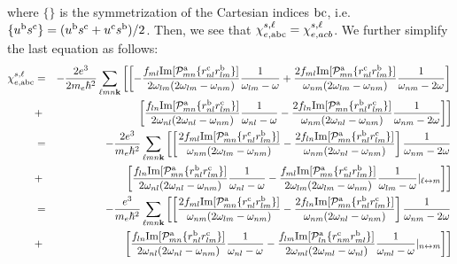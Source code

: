 \documentclass[floatfix,prb,aps,superscriptaddress,11pt,preprint]{revtex4}
\begin{document}
where $\{\}$ is the symmetrization of the Cartesian indices $\mathrm{b}\mathrm{c}$, i.e. 
$\{u^{\mathrm{b}}s^{\mathrm{c}}\}=(u^{\mathrm{b}}s^{\mathrm{c}}+u^{\mathrm{c}}s^{\mathrm{b}})/2$. 
Then, we see that
$\chi_{e,\mathrm{a}\mathrm{b}\mathrm{c}}^{s,\ell}=\chi_{e,acb}^{s,\ell}$. We further simplify 
the last equation as follows:
\begin{eqnarray}\label{pfen2} 
\chi_{e,\rma\rmb\rmc}^{s,\ell}
&=& 
-\frac{2e^3}{2m_e\hbar^2} 
\sum_{\ell m n\bfk}
\left[
\left[
-\frac{f_{ml}\mathrm{Im}[{\cal P}^{\rma}_{mn}\{r^{\rmc}_{nl}r^{\rmb}_{lm}\}]}
{2\go_{lm}(2\go_{lm}-\go_{nm})}\frac{1}{\go_{lm}-\go}
+\frac{2 f_{ml}\mathrm{Im}[{\cal P}^{\rma}_{mn}\{r^{\rmc}_{nl}r^{\rmb}_{lm}\}]}
{\go_{nm}(2\go_{lm}-\go_{nm})}\frac{1}{\go_{nm}-2\go}
\right]
\right.
\nonumber\\
&+&
\left.
\left[
\frac{f_{ln}\mathrm{Im}[{\cal P}^{\rma}_{mn}\{r^{\rmb}_{nl}r^{\rmc}_{lm}\}]}
{2\go_{nl}(2\go_{nl}-\go_{nm})}\frac{1}{\go_{nl}-\go}
-\frac{2 f_{ln}\mathrm{Im}[{\cal P}^{\rma}_{mn}\{r^{\rmb}_{nl}r^{\rmc}_{lm}\}]
}{\go_{nm}(2\go_{nl}-\go_{nm})}\frac{1}{\go_{nm}-2\go}
\right]
\right]
\nonumber\\
&=&
-\frac{2e^3}{m_e\hbar^2} 
\sum_{\ell m n\bfk}
\left[
\left[
\frac{2 f_{ml}\mathrm{Im}[{\cal P}^{\rma}_{mn}\{r^{\rmc}_{nl}r^{\rmb}_{lm}\}]}
{\go_{nm}(2\go_{lm}-\go_{nm})}
-\frac{2 f_{ln}\mathrm{Im}[{\cal P}^{\rma}_{mn}\{r^{\rmb}_{nl}r^{\rmc}_{lm}\}]
}{\go_{nm}(2\go_{nl}-\go_{nm})}
\right]
\frac{1}{\go_{nm}-2\go}
\right.
\nonumber\\
&+&
\left.
\left[
\frac{f_{ln}\mathrm{Im}[{\cal P}^{\rma}_{mn}\{r^{\rmb}_{nl}r^{\rmc}_{lm}\}]}
{2\go_{nl}(2\go_{nl}-\go_{nm})}\frac{1}{\go_{nl}-\go}
-\frac{f_{ml}\mathrm{Im}[{\cal P}^{\rma}_{mn}\{r^{\rmc}_{nl}r^{\rmb}_{lm}\}]}
{2\go_{lm}(2\go_{lm}-\go_{nm})}
\frac{1}{\go_{lm}-\go}|_{\ell\leftrightarrow m}
\right]
\right]
\nonumber\\
&=&
-\frac{e^3}{m_e\hbar^2} 
\sum_{\ell m n\bfk}
\left[
\left[
\frac{2 f_{ml}\mathrm{Im}[{\cal P}^{\rma}_{mn}\{r^{\rmc}_{nl}r^{\rmb}_{lm}\}]}
{\go_{nm}(2\go_{lm}-\go_{nm})}
-\frac{2 f_{ln}\mathrm{Im}[{\cal P}^{\rma}_{mn}\{r^{\rmb}_{nl}r^{\rmc}_{lm}\}]
}{\go_{nm}(2\go_{nl}-\go_{nm})}
\right]
\frac{1}{\go_{nm}-2\go}
\right.
\nonumber\\
&+&
\left.
\left[
\frac{f_{ln}\mathrm{Im}[{\cal P}^{\rma}_{mn}\{r^{\rmb}_{nl}r^{\rmc}_{lm}\}]}
{2\go_{nl}(2\go_{nl}-\go_{nm})}\frac{1}{\go_{nl}-\go}
-\frac{f_{lm}\mathrm{Im}[{\cal P}^{\rma}_{ln}\{r^{\rmc}_{nm}r^{\rmb}_{ml}\}]}
{2\go_{ml}(2\go_{ml}-\go_{nl})}\frac{1}{\go_{ml}-\go}|_{n\leftrightarrow m}
\right]
\right]
\nonumber\\

\end{eqnarray}
\end{document}
